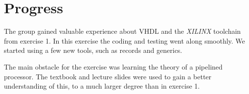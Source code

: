 \section{Progress}
The group gained valuable experience about VHDL and the \textit{XILINX} toolchain from exercise 1.
In this exercise the coding and testing went along smoothly.
We started using a few new tools, such as records and generics.

The main obstacle for the exercise was learning the theory of a pipelined processor.
The textbook and lecture slides were used to gain a better understanding of this,
to a much larger degree than in exercise 1.

